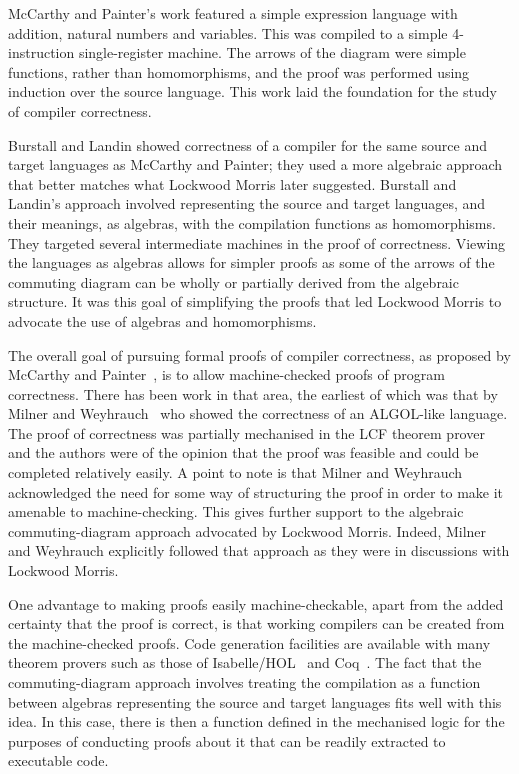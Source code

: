 McCarthy and Painter's work featured a simple expression language with
addition, natural numbers and variables.
This was compiled to a simple 4-instruction single-register machine.
The arrows of the diagram were simple functions, rather than
homomorphisms, and the proof was performed using induction over the
source language.
This work laid the foundation for the study of compiler correctness.

Burstall and Landin showed correctness of a compiler for the same
source and target languages as McCarthy and Painter; they used a more
algebraic approach that better matches what Lockwood Morris later
suggested.
Burstall and Landin's approach involved representing the source and
target languages, and their meanings, as algebras, with the
compilation functions as homomorphisms.
They targeted several intermediate machines in the proof of
correctness.
Viewing the languages as algebras allows for simpler proofs as some of
the arrows of the commuting diagram can be wholly or partially derived
from the algebraic structure.
It was this goal of simplifying the proofs that led Lockwood Morris to
advocate the use of algebras and homomorphisms.

The overall goal of pursuing formal proofs of compiler correctness, as
proposed by McCarthy and Painter~\cite{mccarthy1967}, is to allow
machine-checked proofs of program correctness.
There has been work in that area, the earliest of which was that by
Milner and Weyhrauch~\cite{milner1972} who showed the correctness of
an ALGOL-like language.
The proof of correctness was partially mechanised in the LCF theorem
prover~\cite{milner1972a} and the authors were of the opinion that the
proof was feasible and could be completed relatively easily.
A point to note is that Milner and Weyhrauch acknowledged the need for
some way of structuring the proof in order to make it amenable to
machine-checking.
This gives further support to the algebraic commuting-diagram approach
advocated by Lockwood Morris.
Indeed, Milner and Weyhrauch explicitly followed that approach as they
were in discussions with Lockwood Morris.

One advantage to making proofs easily machine-checkable, apart from
the added certainty that the proof is correct, is that working
compilers can be created from the machine-checked proofs.
Code generation facilities are available with many theorem provers
such as those of Isabelle/HOL~\cite{haftmann2007} and
Coq~\cite{letouzey2003, letouzey2008}.
The fact that the commuting-diagram approach involves treating the
compilation as a function between algebras representing the source and
target languages fits well with this idea.
In this case, there is then a function defined in the mechanised logic
for the purposes of conducting proofs about it that can be readily
extracted to executable code.

